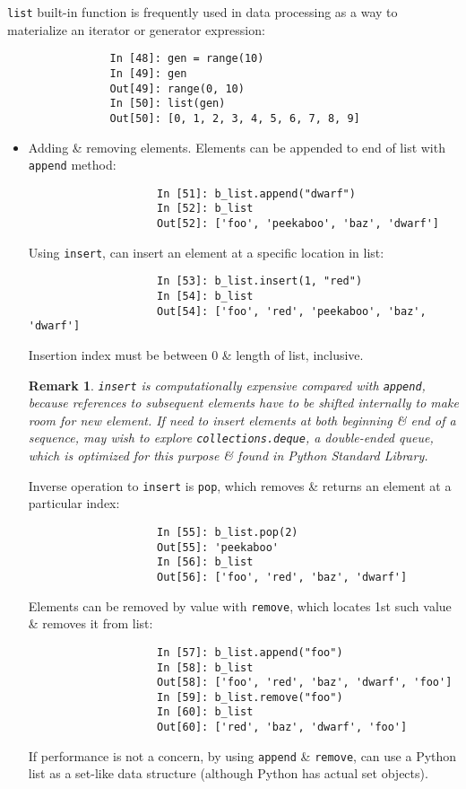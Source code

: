\documentclass{article}
\newtheorem{remark}{Remark}
\begin{document}
\begin{itemize}
\begin{itemize}
\begin{itemize}
			{\tt list} built-in function is frequently used in data processing as a way to materialize an iterator or generator expression:
			\begin{verbatim}
				In [48]: gen = range(10)
				In [49]: gen
				Out[49]: range(0, 10)
				In [50]: list(gen)
				Out[50]: [0, 1, 2, 3, 4, 5, 6, 7, 8, 9]
			\end{verbatim}
			\begin{itemize}
				\item {\sf Adding \& removing elements.} Elements can be appended to end of list with {\tt append} method:
				\begin{verbatim}
					In [51]: b_list.append("dwarf")
					In [52]: b_list
					Out[52]: ['foo', 'peekaboo', 'baz', 'dwarf']
				\end{verbatim}
				Using {\tt insert}, can insert an element at a specific location in list:
				\begin{verbatim}
					In [53]: b_list.insert(1, "red")
					In [54]: b_list
					Out[54]: ['foo', 'red', 'peekaboo', 'baz', 'dwarf']
				\end{verbatim}
				Insertion index must be between 0 \& length of list, inclusive.					
				\begin{remark}
					{\tt insert} is computationally expensive compared with {\tt append}, because references to subsequent elements have to be shifted internally to make room for new element. If need to insert elements at both beginning \& end of a sequence, may wish to explore {\tt collections.deque}, a double-ended queue, which is optimized for this purpose \& found in Python Standard Library.
				\end{remark}
				Inverse operation to {\tt insert} is {\tt pop}, which removes \& returns an element at a particular index:
				\begin{verbatim}
					In [55]: b_list.pop(2)
					Out[55]: 'peekaboo'
					In [56]: b_list
					Out[56]: ['foo', 'red', 'baz', 'dwarf']
				\end{verbatim}
				Elements can be removed by value with {\tt remove}, which locates 1st such value \& removes it from list:
				\begin{verbatim}
					In [57]: b_list.append("foo")
					In [58]: b_list
					Out[58]: ['foo', 'red', 'baz', 'dwarf', 'foo']
					In [59]: b_list.remove("foo")
					In [60]: b_list
					Out[60]: ['red', 'baz', 'dwarf', 'foo']
				\end{verbatim}
				If performance is not a concern, by using {\tt append} \& {\tt remove}, can use a Python list as a set-like data structure (although Python has actual set objects).
				

\end{itemize}
\end{itemize}
\end{itemize}
\end{itemize}
\end{document}
